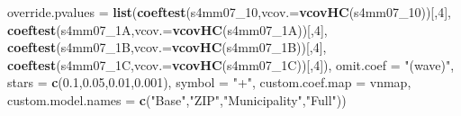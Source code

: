 \documentclass[
]{article}
\newenvironment{Shaded}{\begin{snugshade}}{\end{snugshade}}
\newcommand{\DataTypeTok}[1]{\textcolor[rgb]{0.13,0.29,0.53}{#1}}
\newcommand{\DecValTok}[1]{\textcolor[rgb]{0.00,0.00,0.81}{#1}}
\newcommand{\FloatTok}[1]{\textcolor[rgb]{0.00,0.00,0.81}{#1}}
\newcommand{\KeywordTok}[1]{\textcolor[rgb]{0.13,0.29,0.53}{\textbf{#1}}}
\newcommand{\NormalTok}[1]{#1}
\newcommand{\StringTok}[1]{\textcolor[rgb]{0.31,0.60,0.02}{#1}}
\begin{document}
\begin{Shaded}
\begin{Highlighting}[]
          \DataTypeTok{override.pvalues =} \KeywordTok{list}\NormalTok{(}\KeywordTok{coeftest}\NormalTok{(s4mm07_}\DecValTok{10}\NormalTok{,}\DataTypeTok{vcov.=}\KeywordTok{vcovHC}\NormalTok{(s4mm07_}\DecValTok{10}\NormalTok{))[,}\DecValTok{4}\NormalTok{],}
                                  \KeywordTok{coeftest}\NormalTok{(s4mm07_1A,}\DataTypeTok{vcov.=}\KeywordTok{vcovHC}\NormalTok{(s4mm07_1A))[,}\DecValTok{4}\NormalTok{],}
                                  \KeywordTok{coeftest}\NormalTok{(s4mm07_1B,}\DataTypeTok{vcov.=}\KeywordTok{vcovHC}\NormalTok{(s4mm07_1B))[,}\DecValTok{4}\NormalTok{],}
                                  \KeywordTok{coeftest}\NormalTok{(s4mm07_1C,}\DataTypeTok{vcov.=}\KeywordTok{vcovHC}\NormalTok{(s4mm07_1C))[,}\DecValTok{4}\NormalTok{]),}
          \DataTypeTok{omit.coef =} \StringTok{"(wave)"}\NormalTok{, }\DataTypeTok{stars =} \KeywordTok{c}\NormalTok{(}\FloatTok{0.1}\NormalTok{,}\FloatTok{0.05}\NormalTok{,}\FloatTok{0.01}\NormalTok{,}\FloatTok{0.001}\NormalTok{), }\DataTypeTok{symbol =} \StringTok{"+"}\NormalTok{,}
          \DataTypeTok{custom.coef.map =}\NormalTok{ vnmap, }
          \DataTypeTok{custom.model.names =} \KeywordTok{c}\NormalTok{(}\StringTok{"Base"}\NormalTok{,}\StringTok{"ZIP"}\NormalTok{,}\StringTok{"Municipality"}\NormalTok{,}\StringTok{"Full"}\NormalTok{))}
\end{Highlighting}
\end{Shaded}
\end{document}
